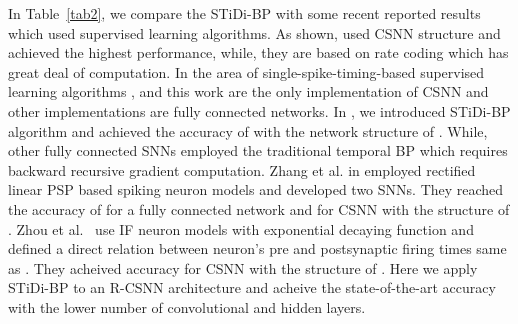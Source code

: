 \documentclass[preprint,twocolumn,5p,12pt]{article}
\begin{document}
\begin{table} 
\begin{center}
\caption{Model parameters for MNIST dataset in R-CSNN.}\label{tab1}
\end{center}
\end{table}

In Table~\ref{tab2}, we compare the STiDi-BP with some recent reported results which used supervised learning algorithms. 
As shown, \cite{R11,R13} used CSNN structure and achieved the highest performance, while, they are based on rate coding which has great deal of computation.
In the area of single-spike-timing-based supervised learning algorithms 
\cite{R18,S1}, and this work are the only implementation of CSNN and other implementations \cite{R8,R9,R10,R3} are fully connected networks.
In \cite{R3}, we introduced STiDi-BP algorithm and achieved the accuracy of  with the network structure of . 
While, other fully connected SNNs\cite{R8,R9,R10,R18} employed the traditional temporal BP which requires backward recursive gradient computation.
Zhang et al. in \cite{R18} employed rectified linear PSP based spiking neuron models and developed two SNNs. They reached the accuracy of  for a fully connected network and  for CSNN with the structure of . 
Zhou et al.~\cite{S1} use IF neuron models with exponential decaying function and defined a direct relation between neuron’s pre and postsynaptic firing times same as \cite{R8}. They acheived  accuracy for CSNN with the structure of . 
Here we apply STiDi-BP to an R-CSNN architecture and acheive the state-of-the-art accuracy with the lower number of convolutional and hidden layers.
\end{document}
